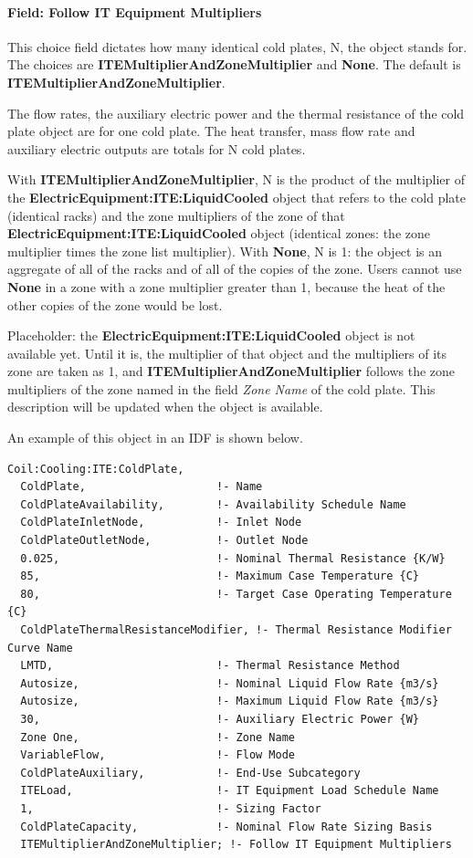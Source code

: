 \paragraph{Field: Follow IT Equipment Multipliers}\label{field-follow-it-equipment-multipliers-coilcoolingitecoldplate}

This choice field dictates how many identical cold plates, N, the object stands for. The choices are \textbf{ITEMultiplierAndZoneMultiplier} and \textbf{None}. The default is \textbf{ITEMultiplierAndZoneMultiplier}.

The flow rates, the auxiliary electric power and the thermal resistance of the cold plate object are for one cold plate. The heat transfer, mass flow rate and auxiliary electric outputs are totals for N cold plates.

With \textbf{ITEMultiplierAndZoneMultiplier}, N is the product of the multiplier of the \textbf{ElectricEquipment:ITE:LiquidCooled} object that refers to the cold plate (identical racks) and the zone multipliers of the zone of that \textbf{ElectricEquipment:ITE:LiquidCooled} object (identical zones: the zone multiplier times the zone list multiplier). With \textbf{None}, N is 1: the object is an aggregate of all of the racks and of all of the copies of the zone. Users cannot use \textbf{None} in a zone with a zone multiplier greater than 1, because the heat of the other copies of the zone would be lost.

Placeholder: the \textbf{ElectricEquipment:ITE:LiquidCooled} object is not available yet. Until it is, the multiplier of that object and the multipliers of its zone are taken as 1, and \textbf{ITEMultiplierAndZoneMultiplier} follows the zone multipliers of the zone named in the field \emph{Zone Name} of the cold plate. This description will be updated when the object is available.

An example of this object in an IDF is shown below.

\begin{lstlisting}
Coil:Cooling:ITE:ColdPlate,
  ColdPlate,                    !- Name
  ColdPlateAvailability,        !- Availability Schedule Name
  ColdPlateInletNode,           !- Inlet Node
  ColdPlateOutletNode,          !- Outlet Node
  0.025,                        !- Nominal Thermal Resistance {K/W}
  85,                           !- Maximum Case Temperature {C}
  80,                           !- Target Case Operating Temperature {C}
  ColdPlateThermalResistanceModifier, !- Thermal Resistance Modifier Curve Name
  LMTD,                         !- Thermal Resistance Method
  Autosize,                     !- Nominal Liquid Flow Rate {m3/s}
  Autosize,                     !- Maximum Liquid Flow Rate {m3/s}
  30,                           !- Auxiliary Electric Power {W}
  Zone One,                     !- Zone Name
  VariableFlow,                 !- Flow Mode
  ColdPlateAuxiliary,           !- End-Use Subcategory
  ITELoad,                      !- IT Equipment Load Schedule Name
  1,                            !- Sizing Factor
  ColdPlateCapacity,            !- Nominal Flow Rate Sizing Basis
  ITEMultiplierAndZoneMultiplier; !- Follow IT Equipment Multipliers
\end{lstlisting}

